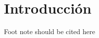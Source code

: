\chapter{Introducción}



\lipsum[1]
\newpage
\lipsum[5]
\newpage
\lipsum[5]
\newpage
\par
Foot note should be cited here %